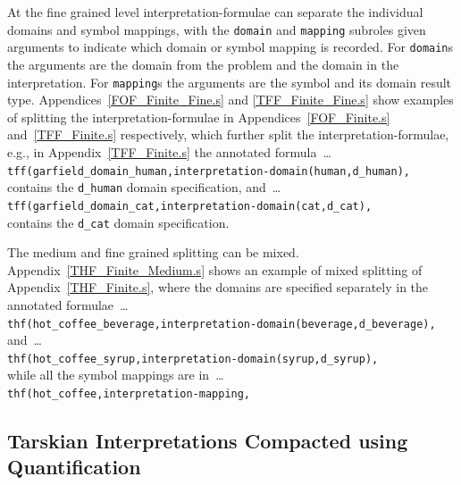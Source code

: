 \documentclass{easychair}
\newcommand{\smalltt}[1]{\small \texttt{#1}}
\begin{document}
At the fine grained level interpretation-formulae can separate the individual domains and symbol 
mappings, with the {\tt domain} and {\tt mapping} subroles given arguments to indicate
which domain or symbol mapping is recorded.
For {\tt domain}s the arguments are the domain from the problem and the domain in the 
interpretation.
For {\tt mapping}s the arguments are the symbol and its domain result type.
Appendices~\ref{FOF_Finite_Fine.s} and \ref{TFF_Finite_Fine.s} show examples of splitting the 
interpretation-formulae in Appendices~\ref{FOF_Finite.s} and~\ref{TFF_Finite.s} respectively, 
which further split the interpretation-formulae, e.g., in Appendix~\ref{TFF_Finite.s} the 
annotated formula~\ldots \\
\hspace*{1.0em}\smalltt{tff(garfield\_domain\_human,interpretation-domain(human,d\_human),} \\
contains the {\tt d\_human} domain specification, and~\ldots \\
\hspace*{1.0em}\smalltt{tff(garfield\_domain\_cat,interpretation-domain(cat,d\_cat),} \\
contains the {\tt d\_cat} domain specification.

The medium and fine grained splitting can be mixed.
Appendix~\ref{THF_Finite_Medium.s} shows an example of mixed splitting of 
Appendix~\ref{THF_Finite.s}, where the domains are specified separately in the annotated
formulae~\ldots \\
\hspace*{1.0em}\smalltt{thf(hot\_coffee\_beverage,interpretation-domain(beverage,d\_beverage),} \\
and~\ldots \\
\hspace*{1.0em}\smalltt{thf(hot\_coffee\_syrup,interpretation-domain(syrup,d\_syrup),} \\
while all the symbol mappings are in~\ldots \\
\hspace*{1.0em}\smalltt{thf(hot\_coffee,interpretation-mapping,}

\subsection{Tarskian Interpretations Compacted using Quantification}
\label{NewTarskianCompact}
\end{document}
